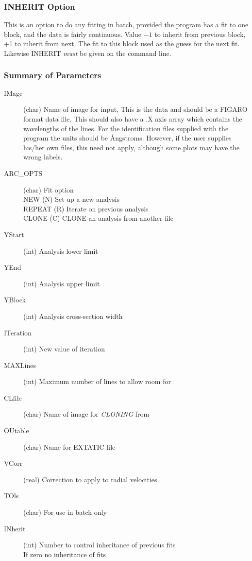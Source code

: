 \subsubsection{INHERIT Option}

This is an option to do any fitting in batch, provided the program has
a fit to one block, and the data is fairly continuous. Value $-1$ to
inherit from previous block, +1 to inherit from next.
The fit to this block used as the guess for the next fit.
Likewise INHERIT {\em must} be given on the command line.

\subsubsection{Summary of Parameters}

\begin{description}
\item[IMage] (char) Name of image for input, This is the data and should
be a FIGARO format data file.
This should also have a .X axis array which contains the wavelengths of
the lines. For the identification files supplied with the program the
units should be {\AA}ngstroms. However, if the user supplies his/her own
files, this need not apply, although some plots may have the wrong
labels.
\item[ARC\_OPTS] (char) Fit option\\
NEW    (N) Set up a new analysis\\
REPEAT (R) Iterate on  previous analysis\\
CLONE  (C) CLONE an analysis from another file
\item[YStart] (int) Analysis lower limit
\item[YEnd] (int) Analysis upper limit
\item[YBlock] (int) Analysis cross-section width
\item[ITeration] (int) New value of iteration
\item[MAXLines] (int) Maximum number of lines to allow room for
\item[CLfile] (char) Name of image for {\em CLONING} from
\item[OUtable] (char) Name for EXTATIC file
\item[VCorr] (real) Correction to apply to radial velocities
\item[TOls] (char) For use in batch only
\item[INherit] (int) Number to control inheritance of  previous fits\\
If zero no inheritance of fits\\

\end{description}
